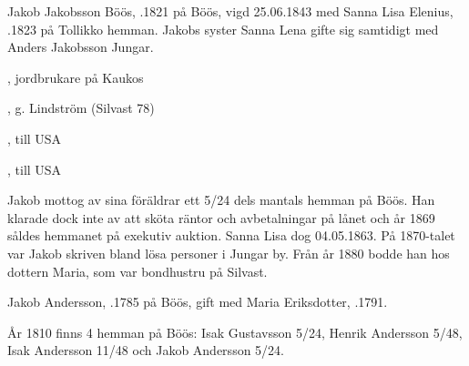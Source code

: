 Jakob Jakobsson Böös, .1821 på Böös, vigd 25.06.1843 med Sanna Lisa Elenius, .1823 på Tollikko hemman. Jakobs syster Sanna Lena gifte sig samtidigt med Anders Jakobsson Jungar.
\begin{jhchildren}
  \item {}, jordbrukare på Kaukos
  \item {}, g. Lindström (Silvast 78)
  \item {}
  \item {}, till USA
  \item {}
  \item {}
  \item {}, till USA
\end{jhchildren}
Jakob mottog av sina föräldrar ett 5/24 dels mantals hemman på Böös. Han klarade dock inte av att sköta räntor och avbetalningar på lånet och år 1869 såldes hemmanet på exekutiv auktion. Sanna Lisa dog 04.05.1863. På 1870-talet var Jakob skriven bland lösa personer i Jungar by. Från år 1880 bodde han hos dottern Maria, som var bondhustru på Silvast.

Jakob Andersson, .1785 på Böös, gift med Maria Eriksdotter, .1791.
\begin{jhchildren}
  \item {}
  \item {}
  \item {}
  \item {}
  \item {}
  \item {}
\end{jhchildren}
År 1810 finns 4 hemman på Böös: Isak Gustavsson 5/24, Henrik Andersson 5/48, Isak Andersson 11/48 och Jakob Andersson 5/24.



